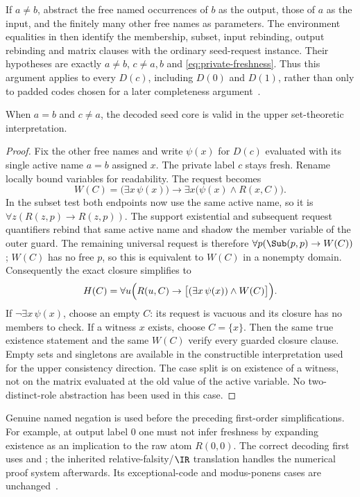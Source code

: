 If $a\ne b$, abstract the free named occurrences of $b$ as the output,
those of $a$ as the input, and the finitely many other free names as
parameters.  The environment equalities in 
then identify the membership, subset, input rebinding, output rebinding
and matrix clauses with the ordinary seed-request instance.  Their
hypotheses are exactly $a\ne b$, $c\ne a,b$ and
\eqref{eq:private-freshness}.  Thus this argument applies to every
$D(c)$, including $D(0)$ and $D(1)$, rather than only to padded codes
chosen for a later completeness argument~\cite{kdecode}.

\begin{lemma}
\label{lem:ks-diagonal}
When $a=b$ and $c\ne a$, the decoded seed core is valid in the upper
set-theoretic interpretation.
\end{lemma}

\begin{proof}
Fix the other free names and write $\psi(x)$ for $D(c)$ evaluated with
its single active name $a=b$ assigned $x$.  The private label $c$ stays
fresh.  Rename locally bound variables for readability.  The request
becomes
\[
 W(C)=\bigl(\exists x\,\psi(x)\bigr)
               \to\exists x\bigl(\psi(x)\land R(x,C)\bigr).
\]
In the subset test both endpoints now use the same active name, so it
is $\forall z(R(z,p)\to R(z,p))$.  The support existential and subsequent
request quantifiers rebind that same active name and shadow the member
variable of the outer guard.  The remaining universal request is therefore
$\forall p(\Sub(p,p)\to W(C))$; $W(C)$ has no free $p$, so this is
equivalent to $W(C)$ in a nonempty domain.  Consequently the exact closure
simplifies to
\[
 H(C)=\forall u\Bigl(R(u,C)\to
                 \bigl[(\exists x\,\psi(x))\land W(C)\bigr]\Bigr).
\]
If $\neg\exists x\,\psi(x)$, choose an empty $C$: its request is vacuous
and its closure has no members to check.  If a witness $x$ exists, choose
$C=\{x\}$.  Then the same true existence statement and the same $W(C)$
verify every guarded closure clause.  Empty sets and singletons are
available in the constructible interpretation used for the upper
consistency direction.  The case split is on existence of a witness,
not on the matrix evaluated at the old value of the active variable.
No two-distinct-role abstraction has been used in this case.
\end{proof}

Genuine named negation is used before the preceding first-order
simplifications.  For example, at output label $0$ one must not infer
freshness by expanding existence as an implication to the raw atom
$R(0,0)$.  The correct decoding first uses  and
; the inherited relative-falsity/$\IR$ translation handles
the numerical proof system afterwards.  Its exceptional-code and
modus-ponens cases are unchanged~\cite{kdecode,klogic,k224}.

